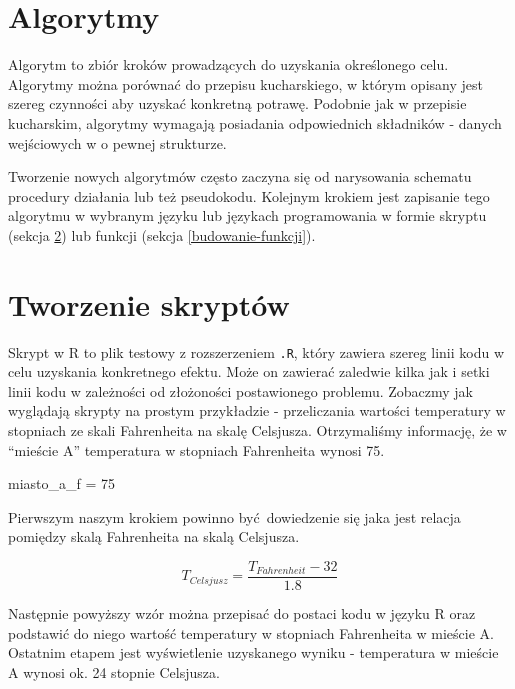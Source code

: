 \documentclass[paper=6in:9in,pagesize=pdftex,headinclude=on,footinclude=on,10pt]{scrbook}
\newenvironment{Shaded}{\begin{snugshade}}{\end{snugshade}}
\newcommand{\DecValTok}[1]{\textcolor[rgb]{0.00,0.00,0.81}{#1}}
\newcommand{\NormalTok}[1]{#1}
\newcommand{\StringTok}[1]{\textcolor[rgb]{0.31,0.60,0.02}{#1}}
\begin{document}
\hypertarget{algorytmy}{%
\section{Algorytmy}\label{algorytmy}}

Algorytm to zbiór kroków prowadzących do uzyskania określonego celu.
Algorytmy można porównać do przepisu kucharskiego, w którym opisany jest szereg czynności aby uzyskać konkretną potrawę.
Podobnie jak w przepisie kucharskim, algorytmy wymagają posiadania odpowiednich składników - danych wejściowych w o pewnej strukturze.

Tworzenie nowych algorytmów często zaczyna się od narysowania schematu procedury działania lub też pseudokodu.
Kolejnym krokiem jest zapisanie tego algorytmu w wybranym języku lub językach programowania w formie skryptu (sekcja \ref{tworzenie-skryptow}) lub funkcji (sekcja \ref{budowanie-funkcji}).

\hypertarget{tworzenie-skryptow}{%
\section{Tworzenie skryptów}\label{tworzenie-skryptow}}

Skrypt w R to plik testowy z rozszerzeniem \texttt{.R}, który zawiera szereg linii kodu w celu uzyskania konkretnego efektu.
Może on zawierać zaledwie kilka jak i setki linii kodu w zależności od złożoności postawionego problemu.
Zobaczmy jak wyglądają skrypty na prostym przykładzie - przeliczania wartości temperatury w stopniach ze skali Fahrenheita na skalę Celsjusza.
Otrzymaliśmy informację, że w ``mieście A'' temperatura w stopniach Fahrenheita wynosi 75.

\begin{Shaded}
\begin{Highlighting}[]
\NormalTok{miasto_a_f =}\StringTok{ }\DecValTok{75}
\end{Highlighting}
\end{Shaded}

Pierwszym naszym krokiem powinno być~dowiedzenie się jaka jest relacja pomiędzy skalą Fahrenheita na skalą Celsjusza.

\[T_{Celsjusz} = \frac{T_{Fahrenheit} - 32}{1.8}\]

Następnie powyższy wzór można przepisać do postaci kodu w języku R oraz podstawić do niego wartość temperatury w stopniach Fahrenheita w mieście A.
Ostatnim etapem jest wyświetlenie uzyskanego wyniku - temperatura w mieście A wynosi ok. 24 stopnie Celsjusza.
\end{document}
